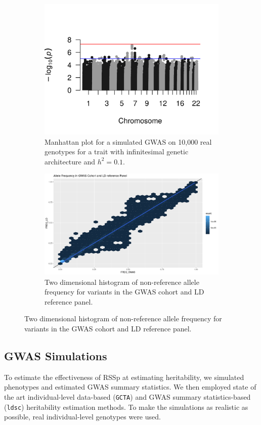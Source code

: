 \begin{figure}
  \centering
  \begin{subfigure}[t]{\textwidth}
    \centering
    \includegraphics[width=\linewidth]{img/rssp_01.png}
    \caption{Manhattan plot for a simulated GWAS on 10,000 real genotypes for a trait with infinitesimal genetic architecture and $h^2=0.1$.  }\label{fig:gwas_01}
  \end{subfigure}
    \begin{subfigure}[t]{\textwidth}
    \centering
    \includegraphics[width=\linewidth]{img/Allele_freq_match.png}
    \caption{Two dimensional histogram of non-reference allele frequency for variants in the GWAS cohort and LD reference panel.}\label{fig:gwas_af_match}
  \end{subfigure}
\end{figure}

\subsection{GWAS Simulations}
To estimate the effectiveness of RSSp at estimating heritability, we simulated phenotypes and estimated GWAS summary statistics. We then employed state of the art individual-level data-based (\texttt{GCTA}\cite{GCTA}) and GWAS summary statistics-based (\texttt{ldsc}\cite{ldsc}) heritability estimation methods.  To make the simulations as realistic as possible, real individual-level genotypes were used.

